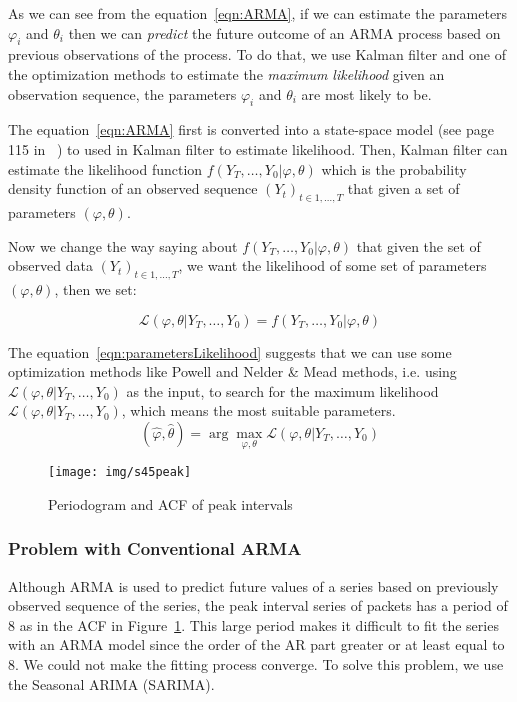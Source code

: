 \documentclass[12pt]{article}
\begin{document}
As we can see from the equation~\ref{eqn:ARMA}, if we can estimate the
parameters $\varphi_i$ and $\theta_i$ then we can \textit{predict} the future
outcome of an ARMA process based on previous observations of the process. To do
that, we use Kalman filter and one of the optimization methods to estimate the
\textit{maximum likelihood} given an observation sequence, the parameters
$\varphi_i$ and $\theta_i$ are most likely to be.

The equation~\ref{eqn:ARMA} first is converted into a state-space model (see
page 115 in~\cite{FalkStatSAS} ) to used in Kalman filter to estimate
likelihood. Then, Kalman filter can estimate the likelihood function
$f(Y_T,\ldots, Y_0|\varphi, \theta)$ which is the probability density
function of an observed sequence $(Y_t)_{t\in 1, \ldots, T}$ that given a set of
parameters $(\varphi, \theta)$.

Now we change the way saying about $f(Y_T,\ldots,Y_0|\varphi, \theta)$ that
given the set of observed data $(Y_t)_{t\in 1, \ldots, T}$, we want the likelihood of
some set of parameters $(\varphi, \theta)$, then we set:

\begin{equation}\label{eqn:parametersLikelihood}
\mathcal{L}(\varphi, \theta|Y_T,\ldots, Y_0) = f(Y_T,\ldots,Y_0|\varphi,
\theta)
\end{equation}

The equation~\ref{eqn:parametersLikelihood} suggests that we can use some
optimization methods like Powell and Nelder \& Mead methods, i.e. using
$\mathcal{L}(\varphi, \theta|Y_T,\ldots, Y_0)$ as the input, to search for the
maximum likelihood $\mathcal{L}(\varphi, \theta|Y_T,\ldots, Y_0)$, which means
the most suitable parameters.
\begin{equation}
(\hat{\varphi},\hat{\theta})=\arg\max_{\varphi, \theta} \mathcal{L}(\varphi,
\theta|Y_T,\ldots, Y_0)
\end{equation}

\begin{figure}[ht!]
\centering
\texttt{[image: img/s45peak]}
\caption{Periodogram and ACF of peak intervals}\label{fig:s45peak}
\end{figure}

\subsubsection{Problem with Conventional ARMA}
Although ARMA is used to predict future values of a series based on
previously observed sequence of the series, the peak interval series of packets
has a period of 8 as in the ACF in Figure~\ref{fig:s45peak}. This large period
makes it difficult to fit the series with an ARMA model since the order of the
AR part greater or at least equal to 8. We could not make the fitting process converge. To solve this problem, we use the Seasonal ARIMA (SARIMA).
\end{document}
